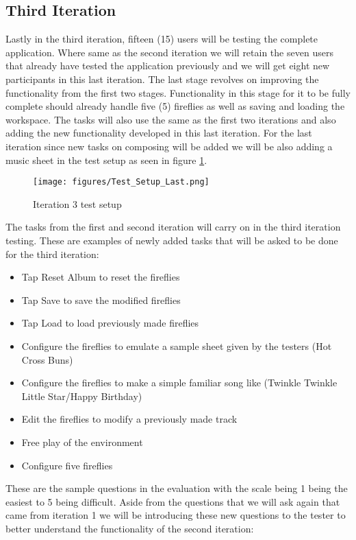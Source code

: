 \subsection{Third Iteration}
Lastly in the third iteration, fifteen (15) users will be testing the complete application. Where same as the second iteration we will retain the seven users that already have tested the application previously and we will get eight new participants in this last iteration. The last stage revolves on improving the functionality from the first two stages. Functionality in this stage for it to be fully complete should already handle five (5) fireflies as well as saving and loading the workspace. The tasks will also use the same as the first two iterations and also adding the new functionality developed in this last iteration. For the last iteration since new tasks on composing will be added we will be also adding a music sheet in the test setup as seen in figure \ref{test3}.

\begin{figure}[H]
    \centering
    \texttt{[image: figures/Test\_Setup\_Last.png]}
    \caption{Iteration 3 test setup}
    \label{test3}
\end{figure}

The tasks from the first and second iteration will carry on in the third iteration testing. These are examples of newly added tasks that will be asked to be done for the third iteration:
\begin{itemize}
    \item Tap Reset Album to reset the fireflies
    \item Tap Save to save the modified fireflies
    \item Tap Load to load previously made fireflies
    \item Configure the fireflies to emulate a sample sheet given by the testers (Hot Cross Buns)
    \item Configure the fireflies to make a simple familiar song like (Twinkle Twinkle Little Star/Happy Birthday)
    \item Edit the fireflies to modify a previously made track
    \item Free play of the environment
    \item Configure five fireflies
\end{itemize}

These are the sample questions in the evaluation with the scale being 1 being the easiest to 5 being difficult. Aside from the questions that we will ask again that came from iteration 1 we will be introducing these new questions to the tester to better understand the functionality of the second iteration:

